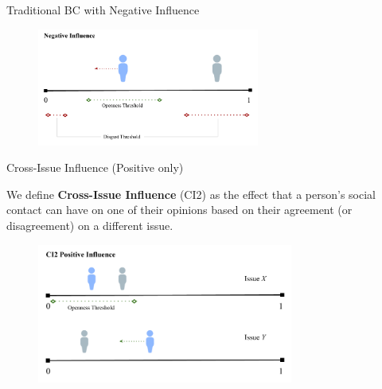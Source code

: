 \documentclass[12pt]{beamer}
\begin{document}
\begin{frame}[c]{Traditional BC with Negative Influence}  %


\begin{figure}
	\includegraphics[width=0.65\textwidth]{images/BCNegativeInfluence.png}
\end{figure}


\end{frame}

\begin{frame}[c]{Cross-Issue Influence (Positive only)}  %

We define \textbf{Cross-Issue Influence} (CI2) as the effect that a person's
social contact can have on one of their opinions based on their agreement (or
disagreement) on a different issue.

\begin{figure}
	\includegraphics[width=0.75\textwidth]{images/CI2Attraction.png}
\end{figure}

\end{frame}
\end{document}
